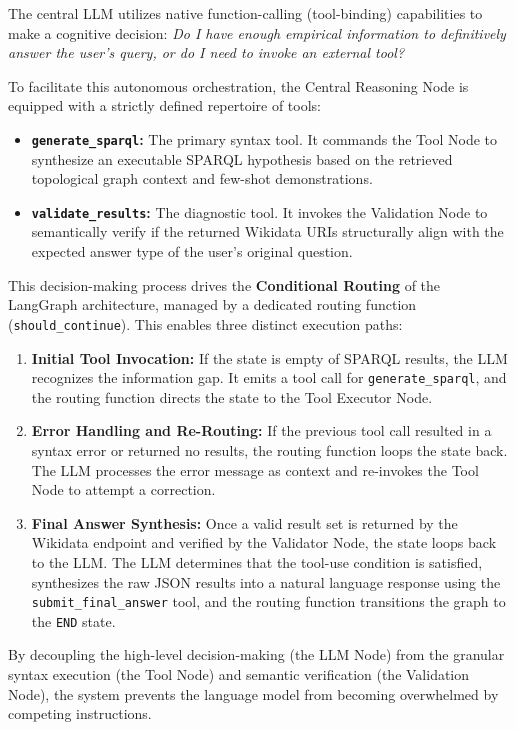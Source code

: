 The central LLM utilizes native function-calling (tool-binding) capabilities to make a cognitive decision: \textit{Do I have enough empirical information to definitively answer the user's query, or do I need to invoke an external tool?} 

To facilitate this autonomous orchestration, the Central Reasoning Node is equipped with a strictly defined repertoire of tools:
\begin{itemize}
    \item \textbf{\texttt{generate\_sparql}:} The primary syntax tool. It commands the Tool Node to synthesize an executable SPARQL hypothesis based on the retrieved topological graph context and few-shot demonstrations.
    \item \textbf{\texttt{validate\_results}:} The diagnostic tool. It invokes the Validation Node to semantically verify if the returned Wikidata URIs structurally align with the expected answer type of the user's original question.
\end{itemize}

This decision-making process drives the \textbf{Conditional Routing} of the LangGraph architecture, managed by a dedicated routing function (\texttt{should\_continue}). This enables three distinct execution paths:
\begin{enumerate}
    \item \textbf{Initial Tool Invocation:} If the state is empty of SPARQL results, the LLM recognizes the information gap. It emits a tool call for \texttt{generate\_sparql}, and the routing function directs the state to the Tool Executor Node.
    \item \textbf{Error Handling and Re-Routing:} If the previous tool call resulted in a syntax error or returned no results, the routing function loops the state back. The LLM processes the error message as context and re-invokes the Tool Node to attempt a correction.
    \item \textbf{Final Answer Synthesis:} Once a valid result set is returned by the Wikidata endpoint and verified by the Validator Node, the state loops back to the LLM. The LLM determines that the tool-use condition is satisfied, synthesizes the raw JSON results into a natural language response using the \texttt{submit\_final\_answer} tool, and the routing function transitions the graph to the \texttt{END} state.
\end{enumerate}

By decoupling the high-level decision-making (the LLM Node) from the granular syntax execution (the Tool Node) and semantic verification (the Validation Node), the system prevents the language model from becoming overwhelmed by competing instructions.

